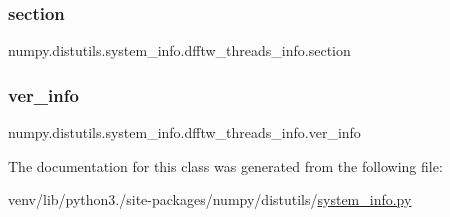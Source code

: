 \subsubsection{\texorpdfstring{section}{section}}
{\footnotesize\ttfamily numpy.\+distutils.\+system\+\_\+info.\+dfftw\+\_\+threads\+\_\+info.\+section\hspace{0.3cm}{\ttfamily [static]}}

\mbox{\label{classnumpy_1_1distutils_1_1system__info_1_1dfftw__threads__info_a66cc0af8005ec466ea08e8a6b3c3fc15}} 
\subsubsection{\texorpdfstring{ver\+\_\+info}{ver\_info}}
{\footnotesize\ttfamily numpy.\+distutils.\+system\+\_\+info.\+dfftw\+\_\+threads\+\_\+info.\+ver\+\_\+info\hspace{0.3cm}{\ttfamily [static]}}



The documentation for this class was generated from the following file\+:\begin{DoxyCompactItemize}
\item 
venv/lib/python3./site-\/packages/numpy/distutils/\hyperlink{system__info_8py}{system\+\_\+info.\+py}\end{DoxyCompactItemize}
